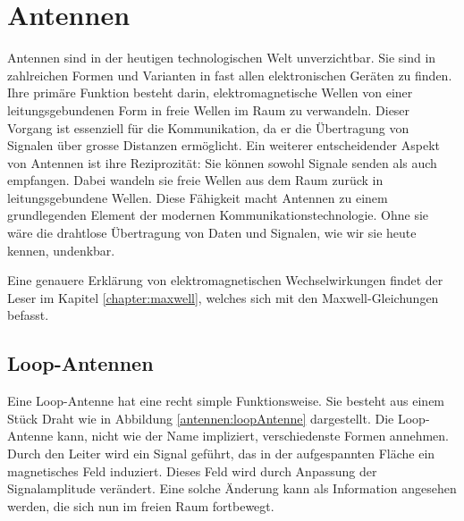%
%
% 
%
%

\section{Antennen\label{antennen:antennenAllgemein}}
Antennen sind in der heutigen technologischen Welt unverzichtbar.
Sie sind in zahlreichen Formen und Varianten in fast allen
elektronischen Geräten zu finden. Ihre primäre Funktion besteht
darin, elektromagnetische Wellen von einer leitungsgebundenen Form
%
%
in freie Wellen im Raum zu verwandeln. Dieser Vorgang ist essenziell
für die Kommunikation, da er die Übertragung von Signalen über grosse
Distanzen ermöglicht. Ein weiterer entscheidender Aspekt von Antennen
ist ihre Reziprozität: Sie können sowohl Signale senden als auch
%
empfangen. Dabei wandeln sie freie Wellen aus dem Raum zurück in
leitungsgebundene Wellen. Diese Fähigkeit macht Antennen zu einem
grundlegenden Element der modernen Kommunikationstechnologie. Ohne
sie wäre die drahtlose Übertragung von Daten und Signalen, wie wir
sie heute kennen, undenkbar.

Eine genauere Erklärung von elektromagnetischen Wechselwirkungen findet der Leser im Kapitel \ref{chapter:maxwell},
welches sich mit den Maxwell-Gleichungen befasst. 
%

\subsection{Loop-Antennen\label{antennen:antennenAllgemein_loop}}


Eine Loop-Antenne hat eine recht simple Funktionsweise. Sie besteht aus einem Stück Draht wie in Abbildung \ref{antennen:loopAntenne} dargestellt. Die Loop-Antenne kann, nicht wie der Name impliziert, verschiedenste Formen annehmen. Durch den Leiter wird ein Signal geführt, das in der aufgespannten Fläche ein magnetisches Feld induziert. Dieses Feld wird durch Anpassung der Signalamplitude verändert. Eine solche Änderung kann als Information angesehen werden, die sich nun im freien Raum fortbewegt.




